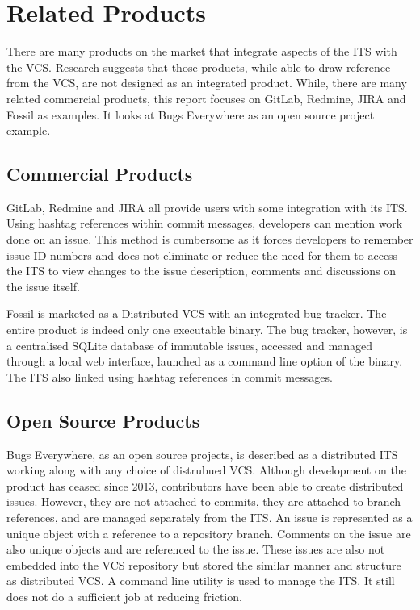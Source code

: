 \documentclass{mproj}
\begin{document}
\section{Related Products}

There are many products on the market that integrate aspects of the ITS with the VCS. Research suggests that those products, while able to draw reference from the VCS, are not designed as an integrated product. While, there are many related commercial products, this report focuses on GitLab, Redmine, JIRA and Fossil as examples. It looks at Bugs Everywhere as an open source project example.

\subsection{Commercial Products}

GitLab, Redmine and JIRA all provide users with some integration with its ITS. Using hashtag references within commit messages, developers can mention work done on an issue. This method is cumbersome as it forces developers to remember issue ID numbers and does not eliminate or reduce the need for them to access the ITS to view changes to the issue description, comments and discussions on the issue itself.

Fossil is marketed as a Distributed VCS with an integrated bug tracker. The entire product is indeed only one executable binary. The bug tracker, however, is a centralised SQLite database of immutable issues, accessed and managed through a local web interface, launched as a command line option of the binary. The ITS also linked using hashtag references in commit messages.

\subsection{Open Source Products}

Bugs Everywhere, as an open source projects, is described as a distributed ITS working along with any choice of distrubued VCS. Although development on the product has ceased since 2013, contributors have been able to create distributed issues. However, they are not attached to commits, they are attached to branch references, and are managed separately from the ITS. An issue is represented as a unique object with a reference to a repository branch. Comments on the issue are also unique objects and are referenced to the issue. These issues are also not embedded into the VCS repository but stored the similar manner and structure as distributed VCS. A command line utility is used to manage the ITS. It still does not do a sufficient job at reducing friction.
\end{document}
